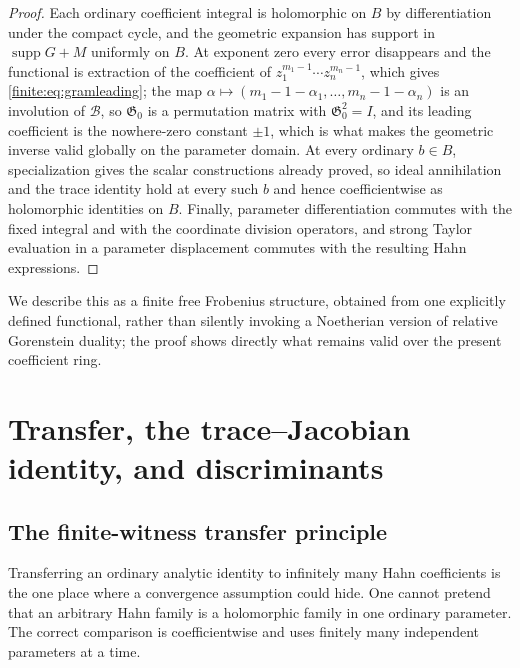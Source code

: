 \documentclass[11pt,letterpaper]{article}
\theoremstyle{definition}
\theoremstyle{remark}
\newcommand{\bx}{\mathcal B}
\newcommand{\Gram}{\mathfrak G}
\DeclareMathOperator{\supp}{supp}
\numberwithin{equation}{section}
\begin{document}
\begin{proof}
Each ordinary coefficient integral is holomorphic on $B$ by differentiation under the compact cycle, and the geometric expansion has support in $\supp G+M$ uniformly on $B$. At exponent zero every error disappears and the functional is extraction of the coefficient of $z_1^{m_1-1}\cdots z_n^{m_n-1}$, which gives \eqref{finite:eq:gramleading}; the map $\alpha\mapsto(m_1-1-\alpha_1,\ldots,m_n-1-\alpha_n)$ is an involution of $\bx$, so $\Gram_0$ is a permutation matrix with $\Gram_0^2=I$, and its leading coefficient is the nowhere-zero constant $\pm1$, which is what makes the geometric inverse valid globally on the parameter domain. At every ordinary $b\in B$, specialization gives the scalar constructions already proved, so ideal annihilation and the trace identity hold at every such $b$ and hence coefficientwise as holomorphic identities on $B$. Finally, parameter differentiation commutes with the fixed integral and with the coordinate division operators, and strong Taylor evaluation in a parameter displacement commutes with the resulting Hahn expressions.
\end{proof}

We describe this as a finite free Frobenius structure, obtained from one explicitly defined functional, rather than silently invoking a Noetherian version of relative Gorenstein duality; the proof shows directly what remains valid over the present coefficient ring.

\section{Transfer, the trace--Jacobian identity, and discriminants}
\label{finite:sec:trace}

\subsection{The finite-witness transfer principle}
\label{finite:sec:transfer}

Transferring an ordinary analytic identity to infinitely many Hahn coefficients is the one place where a convergence assumption could hide. One cannot pretend that an arbitrary Hahn family is a holomorphic family in one ordinary parameter. The correct comparison is coefficientwise and uses finitely many independent parameters at a time.
\end{document}
